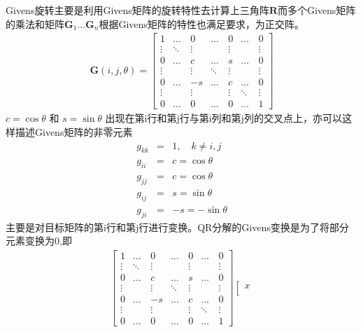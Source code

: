 \documentclass[bachelor,nocolorlinks, printoneside]{seuthesis} %
\begin{document}
\begin{Main}
Givens旋转主要是利用Givens矩阵的旋转特性去计算上三角阵$\mathbf{R}$而多个Givens矩阵的乘法和矩阵$\mathbf{G}_1...\mathbf{G}_n$根据Givens矩阵的特性也满足要求，为正交阵。
\begin{eqnarray}\label{key}
\mathbf{G}(i,j,\theta) = \left[
\begin{array}{ccccccc}
1 & \ldots & 0 & \ldots & 0 & \ldots & 0 \\
\vdots & \ddots & \vdots & \quad & \vdots & \quad & \vdots \\
0 & \ldots & c & \ldots & s & \ldots & 0 \\
\vdots & \quad & \vdots & \ddots & \vdots & \quad & \vdots \\
0 & \ldots & -s & \ldots & c & \ldots & 0 \\
\vdots & \quad & \vdots & \quad & \vdots & \ddots & \vdots \\
0 & \ldots & 0 & \ldots & 0 & \ldots & 1 
\end{array}
\right]
\end{eqnarray}
$c=\cos\theta$ 和 $s = \sin\theta$ 出现在第i行和第j行与第i列和第j列的交叉点上，亦可以这样描述Givens矩阵的非零元素
\begin{eqnarray}\label{key}
g_{kk} &=& 1 , \quad k \neq i,j  \nonumber\\ 
g_{ii} &=& c = \cos \theta \nonumber \\
g_{jj} &=& c = \cos \theta \nonumber \\
g_{ij} &=& s = \sin \theta \nonumber \\
g_{ji} &=& -s = -\sin \theta \nonumber 
\end{eqnarray}
主要是对目标矩阵的第i行和第j行进行变换。QR分解的Givens变换是为了将部分元素变换为0,即
\begin{eqnarray}\label{key}
\left[
\begin{array}{ccccccc}
1 & \ldots & 0 & \ldots & 0 & \ldots & 0 \\
\vdots & \ddots & \vdots & \quad & \vdots & \quad & \vdots \\
0 & \ldots & c & \ldots & s & \ldots & 0 \\
\vdots & \quad & \vdots & \ddots & \vdots & \quad & \vdots \\
0 & \ldots & -s & \ldots & c & \ldots & 0 \\
\vdots & \quad & \vdots & \quad & \vdots & \ddots & \vdots \\
0 & \ldots & 0 & \ldots & 0 & \ldots & 1 
\end{array}
\right]
\left[
\begin{array}{c}
x \\

\end{array}
\end{eqnarray}
\end{Main}
\end{document}
